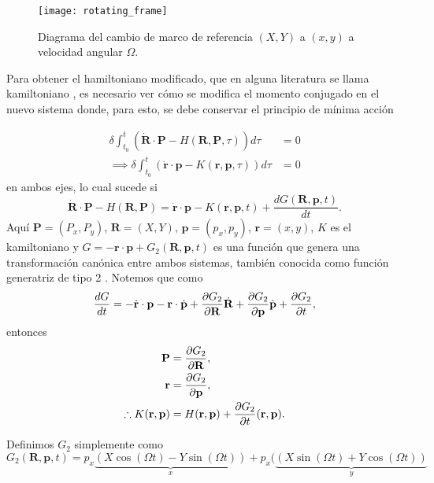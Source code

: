 \begin{figure}[h!]
 \centering
 \texttt{[image: rotating\_frame]}
 \caption{Diagrama del cambio de marco de referencia $(X,Y)$ a $(x,y)$ a velocidad angular $\Omega$.}
 \label{fig:rotating_frames}
\end{figure}

Para obtener el hamiltoniano modificado, que en alguna literatura se llama kamiltoniano \cite{Goldstein2007, Johns2011}, es necesario ver cómo se modifica el momento conjugado en el nuevo sistema donde, para esto, se debe conservar el principio de mínima acción

\begin{align}
 \delta \int_{t_0}^t \left( \dot{\mathbf{R}} \cdot \mathbf{P} - H(\mathbf{R}, \mathbf{P}, \tau) \right) d\tau &= 0 \nonumber \\
\implies \delta \int_{t_0}^t \left( \dot{\mathbf{r}} \cdot \mathbf{p} - K(\mathbf{r}, \mathbf{p}, \tau) \right) d\tau &= 0
 \label{eq:kamiltonian_condition}
\end{align}
en ambos ejes, lo cual sucede si
\begin{equation}
 \dot{\mathbf{R}} \cdot \mathbf{P} - H(\mathbf{R}, \mathbf{P}) = \dot{\mathbf{r}} \cdot \mathbf{p} - K(\mathbf{r}, \mathbf{p}, t) + \frac{dG(\mathbf{R}, \mathbf{p}, t)}{dt}.
\end{equation}
Aquí $\mathbf{P} = (P_x,P_y)$, $\mathbf{R} = (X,Y)$, $\mathbf{p} = (p_x,p_y)$, $\mathbf{r} = (x,y)$, $K$ es el kamiltoniano y $G = - \mathbf{r} \cdot \mathbf{p} + G_2(\mathbf{R}, \mathbf{p}, t)$ es una función que genera una transformación canónica entre ambos sistemas, también conocida como función generatriz de tipo 2 \cite{CanonicalTransformations}. Notemos que como 
\begin{align*}
 \frac{dG}{dt} =  - \dot{\mathbf{r}}\cdot \mathbf{p} - \mathbf{r}\cdot \dot{\mathbf{p}} + \frac{\partial G_2}{\partial \mathbf{R}}\dot{\mathbf{R}} + \frac{\partial G_2}{\partial \mathbf{p}}\dot{\mathbf{p}} + \frac{\partial G_2}{\partial t},
\end{align*}
entonces
\begin{align}
 \mathbf{P} &= \frac{\partial G_2}{\partial \mathbf{R}} \nonumber, \\
 \mathbf{r} &= \frac{\partial G_2}{\partial \mathbf{p}} \nonumber, \\
 \therefore K(\mathbf{r}, \mathbf{p}) &= H(\mathbf{r}, \mathbf{p}) + \frac{\partial G_2}{\partial t} (\mathbf{r}, \mathbf{p}).
 \label{eq:kamiltonian_formulae}
\end{align}

Definimos $G_2$ simplemente como
\begin{equation}
 G_2(\mathbf{R}, \mathbf{p}, t) = p_x \underbrace{\left( X \cos (\Omega t) - Y \sin (\Omega t) \right) }_{x} + p_x (\underbrace{ \left( X \sin (\Omega t) + Y \cos (\Omega t) \right)}_{y}
 \label{eq:generating_function}
\end{equation}

